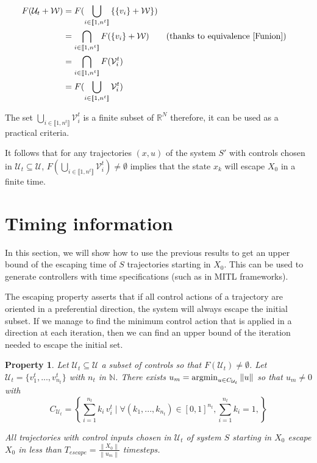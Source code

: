 \documentclass{article}
\newcommand{\argmin}{\operatornamewithlimits{argmin}}
\newtheorem{property}{Property}
\theoremstyle{named}
\begin{document}
\begin{align*}
F(\mathcal{U}_t + \mathcal{W}) &= F(\bigcup_{i\in \llbracket 1,n^t \rrbracket} \left \{ \left \{ v_i \right \} + \mathcal{W} \right \} ) \\
&= \bigcap_{i\in \llbracket 1,n^t \rrbracket} F(\left \{ v_i \right \} + \mathcal{W}) && \text{(thanks to equivalence \ref{Funion})}\\
&= \bigcap_{i\in \llbracket 1,n^t \rrbracket} F(\mathcal{V}^t_i) \\
&= F( \bigcup_{i\in \llbracket 1,n^t \rrbracket} \mathcal{V}^t_i) \\
\end{align*}

The set $\bigcup_{i\in \llbracket 1,n^t \rrbracket} \mathcal{V}^t_i$ is a finite subset of $\mathbb{R}^N$ therefore, it can be used as a practical criteria.

It follows that for any trajectories $(x,u)$ of the system $S'$ with controls chosen in $\mathcal{U}_t \subseteq \mathcal{U}$, $F( \bigcup_{i\in \llbracket 1,n^t \rrbracket} \mathcal{V}^t_i) \neq \emptyset$ implies that the state $x_k$ will escape $X_0$ in a finite time.


\section{Timing  information}\label{sec_timing}
In this section, we will show how to use the previous results to get an upper bound of the escaping time of $S$ trajectories starting in $X_0$.
This can be used to generate controllers with time specifications (such as in MITL frameworks).

The escaping property asserts that if all control actions of a trajectory are oriented in a preferential direction, the system will always escape the initial subset.
If we manage to find the minimum control action that is applied in a direction at each iteration, then we can find an upper bound of the iteration needed to escape the initial set.

\begin{property}
Let $\mathcal{U}_t \subseteq \mathcal{U}$ a subset of controls so that $F(\mathcal{U}_t) \neq \emptyset$. Let $\mathcal{U}_t = \{v_1^t,...,v_{n_t}^t\}$ with $n_t$ in $\mathbb{N}$.
There exists 
$ u_m = \argmin_{u \in C_{\mathcal{U}_t}} \left \| u \right \|$ so that $u_m \neq 0$ with
\begin{equation}
C_{\mathcal{U}_t}=
\left \{
\sum_{i=1}^{n_t} k_i \, v^t_i
\mid 
\forall (k_1,...,k_{n_t}) \in [0,1]^{n_t},
\sum_{i=1}^{n_t} k_i = 1,
\right \}
\end{equation}



All trajectories with control inputs chosen in $\mathcal{U}_t$  of system $S$ starting in $X_0$ escape $X_0$ in less than $T_{escape} =\frac{\left \| X_0 \right \|}{\left \| u_m \right \|}$ timesteps.
\end{property}
\end{document}
